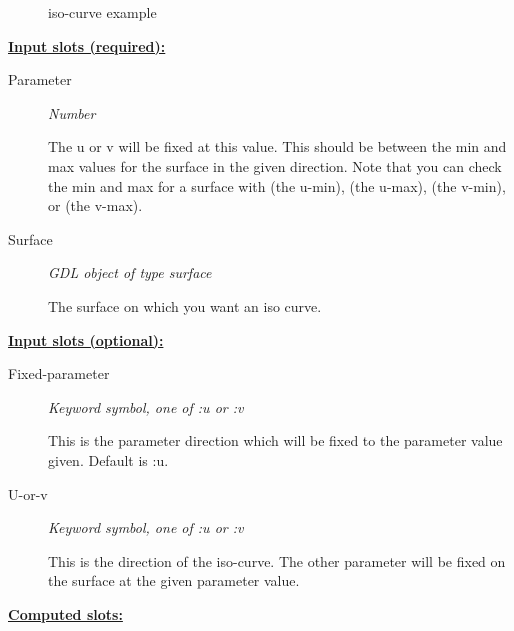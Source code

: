\documentclass [11pt]{book}
\begin{document}
\begin{itemize}
\begin{figure}
\caption{iso-curve example}

\label{fig:iso-curve}

\end{figure}





\textbf{
\underline{Input slots (required):}}

\begin{description}

\item [Parameter]
\emph{Number}

 The u or v will be fixed at this value.
This should be between the min and max values for the surface in the given direction. Note that
you can check the min and max for a surface with (the u-min), (the u-max), (the v-min), or (the v-max).




\item [Surface]
\emph{GDL object of type surface}

 The surface on which you want an iso curve.




\end{description}






\textbf{
\underline{Input slots (optional):}}

\begin{description}

\item [Fixed-parameter]
\emph{Keyword symbol, one of :u or :v}

 This is the parameter direction which will be fixed to the
parameter value given.
Default is :u.




\item [U-or-v]
\emph{Keyword symbol, one of :u or :v}

 This is the direction of the iso-curve. The other parameter will
be fixed on the surface at the given parameter value.




\end{description}






\textbf{
\underline{Computed slots:}}


\end{itemize}
\end{document}
